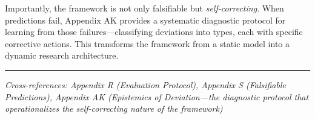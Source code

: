 Importantly, the framework is not only falsifiable but \textit{self-correcting}. When predictions fail, Appendix AK provides a systematic diagnostic protocol for learning from those failures---classifying deviations into types, each with specific corrective actions. This transforms the framework from a static model into a dynamic research architecture.

\vspace{1em}
\hrule
\vspace{0.5em}
\noindent\textit{Cross-references: Appendix R (Evaluation Protocol), 
Appendix S (Falsifiable Predictions), Appendix AK (Epistemics of Deviation---the 
diagnostic protocol that operationalizes the self-correcting nature of the framework)}


